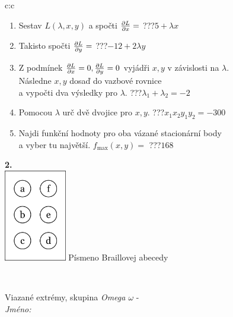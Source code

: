 \documentclass[10pt]{report}
\begin{document}
\begin{tabular}{c:c}
\begin{minipage}[c][104.5mm][t]{0.5\linewidth}
\begin{center}
\begin{minipage}{0.79\linewidth}
\begin{center}
\begin{varwidth}{\linewidth}
\begin{enumerate}
\item Sestav $L(\lambda,x,y)$ a spočti $\pdv{L}{x}=$\quad \dotfill\; ???\;\dotfill \quad $5+\lambda x$
\item Takisto spočti $\pdv{L}{y}=$\quad \dotfill\; ???\;\dotfill \quad $-12+2\lambda y$
\item Z podmínek $\pdv{L}{x}=0 , \pdv{L}{y}=0$ vyjádři $x,y$ v závislosti na $\lambda$.\\ \phantom{xxxxxx}Následne $x,y$ dosaď do vazbové rovnice\\ \phantom{xxxxxx}a vypočti dva výsledky pro $\lambda$.\quad \dotfill\; ???\;\dotfill \quad $\lambda_1+\lambda_2=-2$
\item Pomocou $\lambda$ urč dvě dvojice pro $x,y$.\quad \dotfill\; ???\;\dotfill \quad $x_1 x_2 y_1 y_2=-300$
\item Najdi funkční hodnoty pro oba vázané stacionární body\\ \phantom{xxxxxx}a vyber tu najvětší. $f_{\text{max}}(x,y)=$\quad \dotfill\; ???\;\dotfill \quad $168$
\end{enumerate}
\end{varwidth}
\end{center}
\end{minipage}
\begin{minipage}{0.20\linewidth}
\begin{center}
{\Huge\bfseries 2.} \\[2mm]
\includegraphics[height=40mm]{../images/braille.png}
{\small Písmeno Braillovej abecedy}
\end{center}
\end{minipage}
\end{center}
\end{minipage}
\\ \hdashline
\begin{minipage}[c][104.5mm][t]{0.5\linewidth}
\begin{center}
\vspace{7mm}
{\huge Viazané extrémy, skupina \textit{Omega $\omega$} -}\\[5mm]
\textit{Jméno:}\phantom{xxxxxxxxxxxxxxxxxxxxxxxxxxxxxxxxxxxxxxxxxxxxxxxxxxxxxxxxxxxxxxxxx}\\[5mm]

\end{center}
\end{minipage}
\end{tabular}
\end{document}
